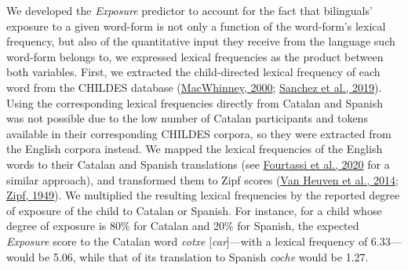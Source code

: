 \documentclass[
]{article}
\begin{document}
We developed the \emph{Exposure} predictor to account for the fact that
bilinguals' exposure to a given word-form is not only a function of the
word-form's lexical frequency, but also of the quantitative input they
receive from the language such word-form belongs to, we expressed
lexical frequencies as the product between both variables. First, we
extracted the child-directed lexical frequency of each word from the
CHILDES database
(\protect\hyperlink{ref-macwhinney2000childes}{MacWhinney, 2000};
\protect\hyperlink{ref-sanchez2019childesdb}{Sanchez et al., 2019}).
Using the corresponding lexical frequencies directly from Catalan and
Spanish was not possible due to the low number of Catalan participants
and tokens available in their corresponding CHILDES corpora, so they
were extracted from the English corpora instead. We mapped the lexical
frequencies of the English words to their Catalan and Spanish
translations (see \protect\hyperlink{ref-fourtassi2020growth}{Fourtassi
et al., 2020} for a similar approach), and transformed them to Zipf
scores (\protect\hyperlink{ref-vanheuven2014subtlexuk}{Van Heuven et
al., 2014}; \protect\hyperlink{ref-zipf1949human}{Zipf, 1949}). We
multiplied the resulting lexical frequencies by the reported degree of
exposure of the child to Catalan or Spanish. For instance, for a child
whose degree of exposure is 80\% for Catalan and 20\% for Spanish, the
expected \emph{Exposure} score to the Catalan word \emph{cotxe}
{[}\emph{car}{]}---with a lexical frequency of 6.33---would be 5.06,
while that of its translation to Spanish \emph{coche} would be 1.27.
\end{document}
